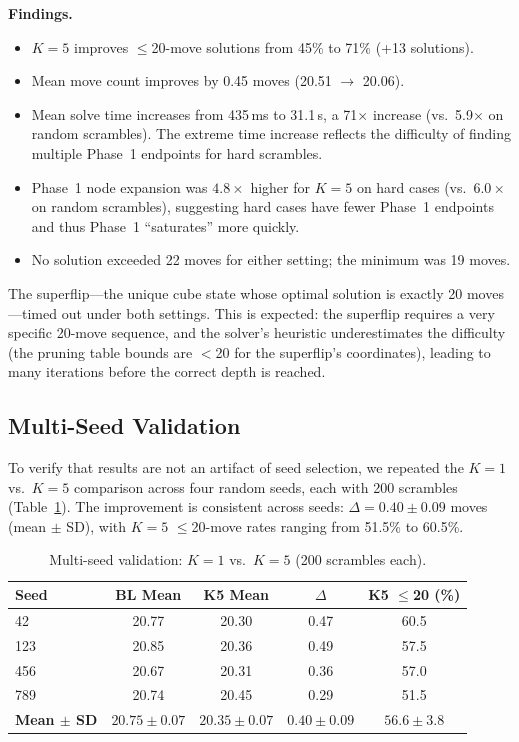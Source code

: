 \documentclass[10pt,twocolumn,a4paper]{article}
\begin{document}
\textbf{Findings.}
\begin{itemize}[leftmargin=*]
  \item $K{=}5$ improves $\leq$20-move solutions from 45\% to 71\% (+13 solutions).
  \item Mean move count improves by 0.45 moves (20.51 $\to$ 20.06).
  \item Mean solve time increases from 435\,ms to 31.1\,s, a 71$\times$ increase (vs.\ 5.9$\times$ on random scrambles). The extreme time increase reflects the difficulty of finding multiple Phase~1 endpoints for hard scrambles.
  \item Phase~1 node expansion was $4.8\times$ higher for $K{=}5$ on hard cases (vs.\ $6.0\times$ on random scrambles), suggesting hard cases have fewer Phase~1 endpoints and thus Phase~1 ``saturates'' more quickly.
  \item No solution exceeded 22 moves for either setting; the minimum was 19 moves.
\end{itemize}

The superflip---the unique cube state whose optimal solution is exactly 20 moves---timed out under both settings. This is expected: the superflip requires a very specific 20-move sequence, and the solver's heuristic underestimates the difficulty (the pruning table bounds are $<$20 for the superflip's coordinates), leading to many iterations before the correct depth is reached.

\subsection{Multi-Seed Validation}
\label{sec:multiseed}

To verify that results are not an artifact of seed selection, we repeated the $K{=}1$ vs.\ $K{=}5$ comparison across four random seeds, each with 200 scrambles (Table~\ref{tab:multiseed}). The improvement is consistent across seeds: $\Delta = 0.40 \pm 0.09$ moves (mean $\pm$ SD), with $K{=}5$ $\leq$20-move rates ranging from 51.5\% to 60.5\%.

\begin{table}[t]
\centering
\caption{Multi-seed validation: $K{=}1$ vs.\ $K{=}5$ (200 scrambles each).}
\label{tab:multiseed}
\begin{tabular}{@{}lcccc@{}}
\toprule
\textbf{Seed} & \textbf{BL Mean} & \textbf{K5 Mean} & \textbf{$\Delta$} & \textbf{K5 $\leq$20 (\%)} \\
\midrule
42  & 20.77 & 20.30 & 0.47 & 60.5 \\
123 & 20.85 & 20.36 & 0.49 & 57.5 \\
456 & 20.67 & 20.31 & 0.36 & 57.0 \\
789 & 20.74 & 20.45 & 0.29 & 51.5 \\
\midrule
\textbf{Mean $\pm$ SD} & $20.75 \pm 0.07$ & $20.35 \pm 0.07$ & $0.40 \pm 0.09$ & $56.6 \pm 3.8$ \\
\bottomrule
\end{tabular}
\end{table}
\end{document}
